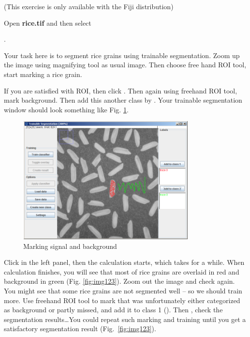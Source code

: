 \begin{indentexercise}{1}
(This exercise is only available with the Fiji distribution)

Open \textbf{rice.tif} and then select 

. 

Your task here is to segment rice grains using trainable segmentation. Zoom up the image
using magnifying tool as usual image. Then choose free hand ROI tool,
start marking a rice grain. 

If you are satisfied with ROI, then click
. Then
again using freehand ROI tool, mark background. Then add this another
class by . Your trainable segmentation window should look
something like Fig. \ref{fig:img122}. 

\begin{figure}[htbp]
\begin{center}
\includegraphics[width=9.001cm,height=6.447cm]{fig/CMCIBasicCourse201102-img122.png}
\caption{ Marking signal and background}
\label{fig:img122}
\end{center}
\end{figure}

Click  in the left panel, then the calculation starts, which takes for a while. When
calculation finishes, you will see that most of rice grains are overlaid in red and background in green (Fig. \ref{fig:img123}). Zoom out the image and check again. You might see that some rice grains are not segmented well -- so we should train more. Use freehand ROI tool to mark that was unfortunately either categorized
as background or partly missed, and add it to class 1 (). Then , check the segmentation results\ldots You
could repeat such marking and training until you get a satisfactory
segmentation result (Fig.~\ref{fig:img123}). 


\end{indentexercise}
